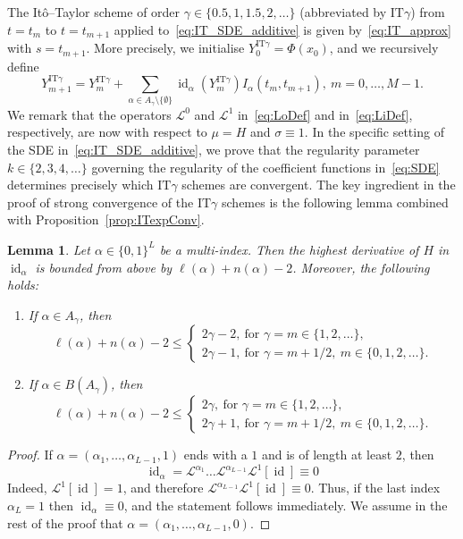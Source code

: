 \documentclass[11pt]{amsart}
\newtheorem{lemma}[theorem]{Lemma}
\newcommand{\IT}{\textrm{IT}}
\newcommand{\Lo}{\mathcal{L}^{0}}
\newcommand{\Li}{\mathcal{L}^{1}}
\newcommand{\LL}{\mathcal{L}}
\newcommand{\id}{\operatorname{id}}
\begin{document}
{The Itô--Taylor scheme of order $\gamma \in \{0.5,1,1.5,2,\ldots \}$ (abbreviated by $\IT \gamma$) from $t = t_{m}$ to $t=t_{m+1}$ applied to~\eqref{eq:IT_SDE_additive} is given by~\eqref{eq:IT_approx} with $s = t_{m+1}$. More precisely, we initialise $Y^{\IT \gamma}_{0} = \Phi(x_{0})$, and we recursively define
\begin{equation}\label{eq:IT_approx_add}
Y^{\IT \gamma}_{m+1} = Y^{\IT \gamma}_{m} +  \sum_{\alpha \in A_{\gamma} \setminus \{  \emptyset \}} \operatorname{id}_{\alpha}(Y^{\IT \gamma}_{m}) I_{\alpha}(t_{m},t_{m+1}),\ m=0,\ldots,M-1.
\end{equation}
We remark that the operators $\Lo$ and $\Li$ in~\eqref{eq:LoDef} and in~\eqref{eq:LiDef}, respectively, are now with respect to $\mu = H$ and $\sigma \equiv 1$. In the specific setting of the SDE in~\eqref{eq:IT_SDE_additive}, we prove that the regularity parameter $k \in \{2,3,4,\ldots\}$ governing the regularity of the coefficient functions in~\eqref{eq:SDE} determines precisely which $\IT \gamma$ schemes are convergent. The key ingredient in the proof of strong convergence of the $\IT \gamma$ schemes is the following lemma combined with Proposition~\ref{prop:ITexpConv}.

\begin{lemma}\label{lem:highDerLemma}
Let $\alpha \in \{ 0,1 \}^{L}$ be a multi-index. Then the highest derivative of $H$ in $\id_{\alpha}$ is bounded from above by $\ell(\alpha) + n(\alpha) - 2$. Moreover, the following holds:
\begin{enumerate}
\item If $\alpha \in A_{\gamma}$, then
\begin{equation*}
\ell(\alpha) + n(\alpha) - 2 \leq \begin{cases} 2 \gamma - 2,\ \text{for } \gamma = m \in \{1,2,\ldots \},\\ 2 \gamma - 1,\ \text{for } \gamma = m + 1/2,\ m \in \{0,1,2,\ldots \}. \end{cases}
\end{equation*}
\item If $\alpha \in B(A_{\gamma})$, then 
\begin{equation*}
\ell(\alpha) + n(\alpha) - 2 \leq \begin{cases} 2 \gamma,\ \text{for } \gamma = m \in \{1,2,\ldots \},\\ 2 \gamma + 1,\ \text{for } \gamma = m + 1/2,\ m \in \{0,1,2,\ldots \}. \end{cases}
\end{equation*}
\end{enumerate}
\end{lemma}
\begin{proof}
If $\alpha = (\alpha_{1},\ldots,\alpha_{L-1},1)$ ends with a $1$ and is of length at least $2$, then
\begin{equation*}
\id_{\alpha} = \LL^{\alpha_{1}} \dots \LL^{\alpha_{L-1}} \Li [\id] \equiv 0
\end{equation*}
Indeed, $\Li [\id] = 1$, and therefore $\LL^{\alpha_{L-1}} \Li [\id] \equiv 0$. Thus, if the last index $\alpha_{L} = 1$ then $\id_{\alpha} \equiv 0$, and the statement follows immediately. We assume in the rest of the proof that $\alpha = (\alpha_{1},\ldots,\alpha_{L-1},0)$.


\end{proof}}
\end{document}
